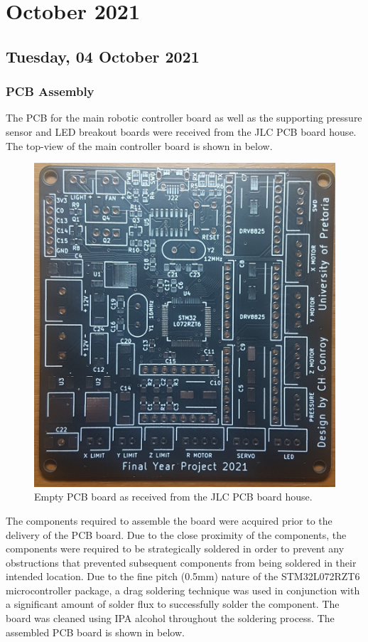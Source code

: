 \chapter[2021 October]{October 2021}

\section[2021/10/04]{Tuesday, 04 October 2021}

\subsection{PCB Assembly}

The PCB for the main robotic controller board as well as the supporting pressure sensor and \ac{LED} breakout boards were received from the JLC PCB board house. The top-view of the main controller board is shown in  below.

\begin{figure}[H]
	\centering
	\includegraphics[width=0.6\linewidth]{figures/202110/pcb-board.jpg}
	\caption{Empty PCB board as received from the JLC PCB board house.}
	\label{fig:empty-pcb}
\end{figure}

The components required to assemble the board were acquired prior to the delivery of the PCB board. Due to the close proximity of the components, the components were required to be strategically soldered in order to prevent any obstructions that prevented subsequent components from being soldered in their intended location. Due to the fine pitch (0.5mm) nature of the STM32L072RZT6 microcontroller package, a drag soldering technique was used in conjunction with a significant amount of solder flux to successfully solder the component. The board was cleaned using \ac{IPA} alcohol throughout the soldering process. The assembled PCB board is shown in  below.

